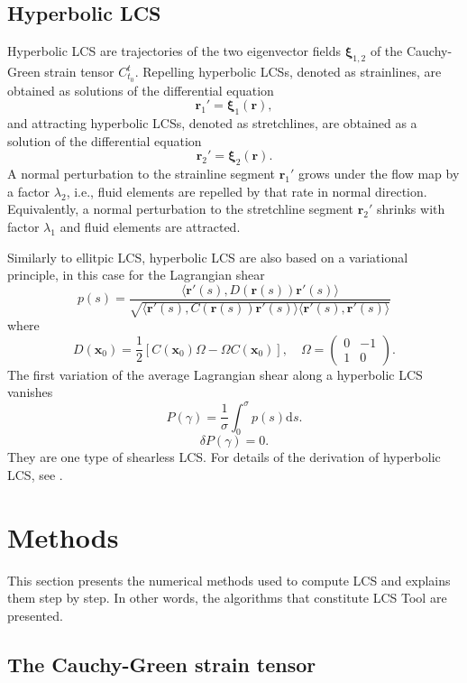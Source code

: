 \documentclass{article}
\begin{document}
\subsection{Hyperbolic LCS}
Hyperbolic LCS are trajectories of the two eigenvector fields $\boldsymbol \xi_{1,2}$ of the Cauchy-Green strain tensor $C_{t_0}^t$. Repelling hyperbolic LCSs, denoted as strainlines, are obtained as solutions of the differential equation
\[
\boldsymbol r_1' = \boldsymbol \xi_1(\boldsymbol r),
\]
and attracting hyperbolic LCSs, denoted as stretchlines, are obtained as a solution of the differential equation
\[
\boldsymbol r_2' = \boldsymbol \xi_2(\boldsymbol r).
\]
A normal perturbation to the strainline segment $\boldsymbol r_1'$ grows under the flow map by a factor $\lambda_2$, i.e., fluid elements are repelled by that rate in normal direction. Equivalently, a normal perturbation to the stretchline segment $\boldsymbol r_2'$ shrinks with factor $\lambda_1$ and fluid elements are attracted.

Similarly to ellitpic LCS, hyperbolic LCS are also based on a variational principle, in this case for the Lagrangian shear
\[
p(s) = \frac{\langle \boldsymbol r'(s), D(\boldsymbol r(s)) \boldsymbol r'(s)\rangle}{\sqrt{\langle \boldsymbol r'(s), C(\boldsymbol r(s)) \boldsymbol r'(s)\rangle \langle \boldsymbol r'(s), \boldsymbol r'(s)\rangle}}
\]
where
\[
D(\boldsymbol x_0) = \frac12[C(\boldsymbol x_0) \Omega - \Omega C(\boldsymbol x_0)], \quad \Omega = \begin{pmatrix}0&-1\\1&0\end{pmatrix}.
\]
The first variation of the average Lagrangian shear along a hyperbolic LCS vanishes
\[
P(\gamma) = \frac{1}{\sigma} \int_0^\sigma p(s) \text{d}s.
\]
\[
\delta P(\gamma) = 0.
\]
They are one type of shearless LCS. For details of the derivation of hyperbolic LCS, see \cite{farazmand13:_shearless}.

\clearpage

\section{Methods}

This section presents the numerical methods used to compute LCS and explains them step by step. In other words, the algorithms that constitute LCS Tool are presented.

\subsection{The Cauchy-Green strain tensor}
\end{document}

